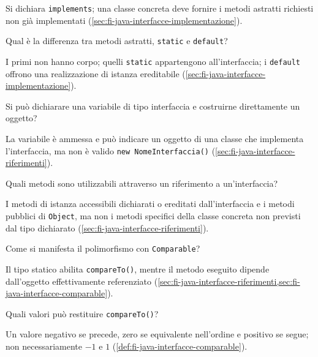 Si dichiara \texttt{implements}; una classe concreta deve fornire i metodi astratti richiesti non già implementati (\cref{sec:fi-java-interfacce-implementazione}).

\begin{exercise}
\label{ex:fi-esercizi-java-interfacce-tipi-metodi}
Qual è la differenza tra metodi astratti, \texttt{static} e \texttt{default}?
\end{exercise}

I primi non hanno corpo; quelli \texttt{static} appartengono all'interfaccia; i \texttt{default} offrono una realizzazione di istanza ereditabile (\cref{sec:fi-java-interfacce-implementazione}).

\begin{exercise}
\label{ex:fi-esercizi-java-interfacce-variabile}
Si può dichiarare una variabile di tipo interfaccia e costruirne direttamente un oggetto?
\end{exercise}

La variabile è ammessa e può indicare un oggetto di una classe che implementa l'interfaccia, ma non è valido \texttt{new NomeInterfaccia()} (\cref{sec:fi-java-interfacce-riferimenti}).

\begin{exercise}
\label{ex:fi-esercizi-java-interfacce-metodi-disponibili}
Quali metodi sono utilizzabili attraverso un riferimento a un'interfaccia?
\end{exercise}

I metodi di istanza accessibili dichiarati o ereditati dall'interfaccia e i metodi pubblici di \texttt{Object}, ma non i metodi specifici della classe concreta non previsti dal tipo dichiarato (\cref{sec:fi-java-interfacce-riferimenti}).

\begin{exercise}
\label{ex:fi-esercizi-java-interfacce-polimorfismo}
Come si manifesta il polimorfismo con \texttt{Comparable}?
\end{exercise}

Il tipo statico abilita \texttt{compareTo()}, mentre il metodo eseguito dipende dall'oggetto effettivamente referenziato (\cref{sec:fi-java-interfacce-riferimenti,sec:fi-java-interfacce-comparable}).

\begin{exercise}
\label{ex:fi-esercizi-java-interfacce-risultato-compareto}
Quali valori può restituire \texttt{compareTo()}?
\end{exercise}

Un valore negativo se precede, zero se equivalente nell'ordine e positivo se segue; non necessariamente \(-1\) e \(1\) (\cref{def:fi-java-interfacce-comparable}).

